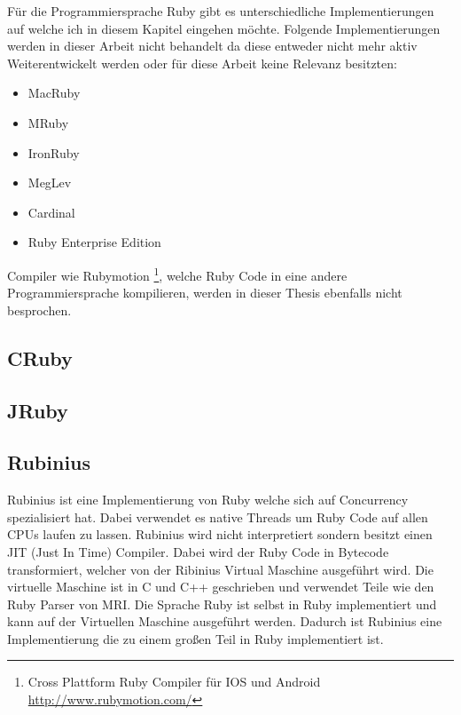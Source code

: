 Für die Programmiersprache Ruby gibt es unterschiedliche Implementierungen auf welche ich in diesem Kapitel eingehen möchte. Folgende Implementierungen werden in dieser Arbeit nicht behandelt da diese entweder nicht mehr aktiv Weiterentwickelt werden oder für diese Arbeit keine Relevanz besitzten:

\begin{itemize}
  \item MacRuby
  \item MRuby
  \item IronRuby
  \item MegLev
  \item Cardinal
  \item Ruby Enterprise Edition
\end{itemize}

Compiler wie Rubymotion \footnote{Cross Plattform Ruby Compiler für IOS und Android \url{http://www.rubymotion.com/}}, welche Ruby Code in eine andere Programmiersprache kompilieren, werden in dieser Thesis ebenfalls nicht besprochen.

\subsection{CRuby}


\subsection{JRuby}


\subsection{Rubinius}
Rubinius ist eine Implementierung von Ruby welche sich auf Concurrency spezialisiert hat. Dabei verwendet es native Threads um Ruby Code auf allen CPUs laufen zu lassen. Rubinius wird nicht interpretiert sondern besitzt einen JIT (Just In Time) Compiler. Dabei wird der Ruby Code in Bytecode transformiert, welcher von der Ribinius Virtual Maschine ausgeführt wird. Die virtuelle Maschine ist in C und C++ geschrieben und verwendet Teile wie den Ruby Parser von MRI. Die Sprache Ruby ist selbst in Ruby implementiert und kann auf der Virtuellen Maschine ausgeführt werden. Dadurch ist Rubinius eine Implementierung die zu einem großen Teil in Ruby implementiert ist. 

